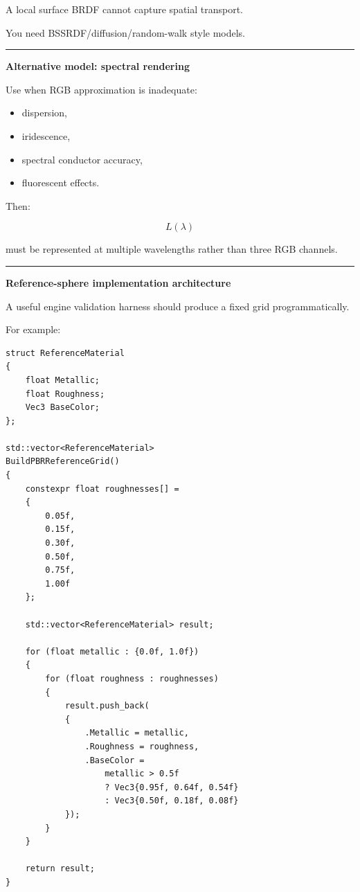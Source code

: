 A local surface BRDF cannot capture spatial transport.

You need BSSRDF/diffusion/random-walk style models.

\begin{center}\rule{0.5\linewidth}{0.5pt}\end{center}

\textbf{Alternative model: spectral rendering}

Use when RGB approximation is inadequate:

\begin{itemize}
\tightlist
\item
  dispersion,
\item
  iridescence,
\item
  spectral conductor accuracy,
\item
  fluorescent effects.
\end{itemize}

Then:

\[
L(\lambda)
\]

must be represented at multiple wavelengths rather than three RGB channels.

\begin{center}\rule{0.5\linewidth}{0.5pt}\end{center}

\textbf{Reference-sphere implementation architecture}

A useful engine validation harness should produce a fixed grid programmatically.

For example:

\begin{verbatim}
struct ReferenceMaterial
{
    float Metallic;
    float Roughness;
    Vec3 BaseColor;
};

std::vector<ReferenceMaterial>
BuildPBRReferenceGrid()
{
    constexpr float roughnesses[] =
    {
        0.05f,
        0.15f,
        0.30f,
        0.50f,
        0.75f,
        1.00f
    };

    std::vector<ReferenceMaterial> result;

    for (float metallic : {0.0f, 1.0f})
    {
        for (float roughness : roughnesses)
        {
            result.push_back(
            {
                .Metallic = metallic,
                .Roughness = roughness,
                .BaseColor =
                    metallic > 0.5f
                    ? Vec3{0.95f, 0.64f, 0.54f}
                    : Vec3{0.50f, 0.18f, 0.08f}
            });
        }
    }

    return result;
}
\end{verbatim}


